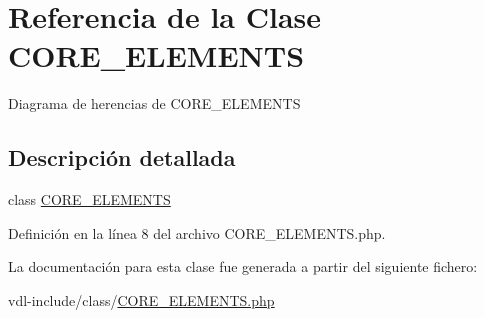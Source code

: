 \hypertarget{classCORE__ELEMENTS}{\section{Referencia de la Clase C\-O\-R\-E\-\_\-\-E\-L\-E\-M\-E\-N\-T\-S}
\label{classCORE__ELEMENTS}
}


Diagrama de herencias de C\-O\-R\-E\-\_\-\-E\-L\-E\-M\-E\-N\-T\-S


\subsection{Descripción detallada}
class \hyperlink{classCORE__ELEMENTS}{C\-O\-R\-E\-\_\-\-E\-L\-E\-M\-E\-N\-T\-S} 

Definición en la línea 8 del archivo C\-O\-R\-E\-\_\-\-E\-L\-E\-M\-E\-N\-T\-S.\-php.



La documentación para esta clase fue generada a partir del siguiente fichero\-:\begin{DoxyCompactItemize}
\item 
vdl-\/include/class/\hyperlink{CORE__ELEMENTS_8php}{C\-O\-R\-E\-\_\-\-E\-L\-E\-M\-E\-N\-T\-S.\-php}\end{DoxyCompactItemize}
